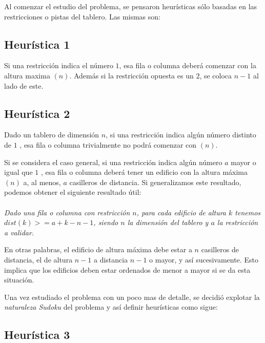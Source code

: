 \documentclass[%
    final,
    reprint,
    notitlepage,
    narroweqnarray,
    inline,
    twoside,
    invited
    ]{ieee}
\begin{document}
\par Al comenzar el estudio del problema, se pensaron heurísticas sólo basadas en las restricciones o pistas del tablero. Las mismas son:\\

\subsection{Heurística 1}

\par Si una restricción indica el número $1$, esa fila o columna deberá comenzar con la altura maxima $(n)$. Además si la restricción opuesta es un $2$, se coloca $n-1$ al lado de este.

\subsection{Heurística 2}

\par Dado un tablero de dimensión $n$, si una restricción indica algún número distinto de $1$ , esa fila o columna trivialmente no podrá comenzar con $(n)$.\\
\par Si se considera el caso general, si una restricción indica algún número $a$ mayor o igual que $1$ , esa fila o columna deberá tener un edificio con la altura máxima $(n)$ a, al menos, $a$ casilleros de distancia.  Si generalizamos este resultado, podemos obtener el siguiente resultado útil:\\\\
\emph{Dado una fila o columna con restricción $n$, para cada edificio de altura $k$ tenemos $dist(k) >= a + k - n - 1 $, siendo $n$ la dimensión del tablero y $a$ la restricción a validar.}\\
\par En otras palabras, el edificio de altura máxima debe estar a $n$ casilleros de distancia, el de altura $n-1$ a distancia $n-1$ o mayor, y así sucesivamente. Esto implica que los edificios deben estar ordenados de menor a mayor si se da esta situación.

\par Una vez estudiado el problema con un poco mas de detalle, se decidió explotar la \textit{naturaleza Sudoku} del problema y así definir heurísticas como sigue:\\

\subsection{Heurística 3}
\end{document}
